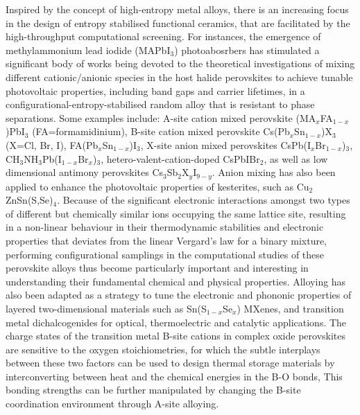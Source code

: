 Inspired by the concept of high-entropy metal alloys, there is an increasing focus in the design of entropy stabilised functional ceramics, that are facilitated by the high-throughput computational screening. For instances, the emergence of methylammonium lead iodide (MAPbI$_3$) photoabosrbers\cite{zhou2014interface} has stimulated a significant body of works being devoted to the theoretical investigations of mixing different cationic/anionic species in the host halide perovskites to achieve tunable photovoltaic properties, including band gaps and carrier lifetimes, in a configurational-entropy-stabilised random alloy  that is resistant to phase separations.\cite{brivio2016thermodynamic} Some  examples include: A-site cation mixed perovskite (MA$_{x}$FA$_{1-x}$)PbI$_{3}$ (FA=formamidinium),\cite{senno2021mixed,schelhas2019insights} B-site cation mixed perovskite Cs(Pb$_{x}$Sn$_{1-x}$)X$_{3}$ (X=Cl, Br, I),\cite{yang2020mapping} FA(Pb$_{x}$Sn$_{1-x}$)I$_{3}$,\cite{kahmann2022compositional} X-site anion mixed perovskites CsPb(I$_{x}$Br$_{1-x}$)$_3$,\cite{yang2020correlating}  {C}{H}$_3${N}{H}$_3${P}b({I}$_{1-x}${B}r$_{x}$)$_3$,\cite{brivio2016thermodynamic} hetero-valent-cation-doped CsPbIBr$_2$,\cite{hu2022valence}  as well as low dimensional antimony perovskites Cs$_3$Sb$_2$X$_{y}$I$_{9-y}$.\cite{yang2021composition}  Anion mixing has also been applied to enhance the photovoltaic properties of kesterites, such as  Cu$_2$ZnSn(S,Se)$_4$.\cite{shang2014cation}
Because of the significant electronic interactions amongst two types of different but chemically similar ions occupying the same lattice site, resulting in a non-linear behaviour in their thermodynamic stabilities and electronic properties that deviates from the linear Vergard's law for a binary mixture,\cite{dalpian2019formation} performing configurational samplings in the computational studies of these perovskite alloys thus become particularly important and interesting in understanding their fundamental chemical and physical properties.  Alloying has also been adapted as a strategy to tune the electronic and phononic properties of layered two-dimensional materials such as {S}n({S}$_{1-x}${S}e$_x$)\cite{gunn2019thermodynamics,skelton2020lattice}  MXenes,\cite{han2020tailoring,nemani2021high} and transition metal dichalcogenides\cite{cavin20212d} for optical, thermoelectric and catalytic applications. The charge states of the transition metal B-site cations in complex oxide perovskites are sensitive to the oxygen stoichiometries, for which the subtle interplays between these two factors can be used to design thermal storage materials by interconverting between heat and the chemical energies in the B-O bonds,\cite{lei2022redox} This bonding strengths can be further manipulated by changing the B-site coordination environment through A-site alloying.\cite{sai2020exploring} 

